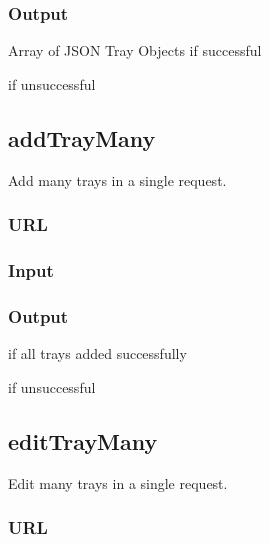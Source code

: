 \documentclass[letterpaper,10pt,english]{sphinxmanual}
\let\oldsubsection\subsection
\renewcommand{\subsection}{\needspace{6\baselineskip}\oldsubsection}
\begin{document}
\subsubsection{Output}
\label{\detokenize{docs/Developer/getAllCategory:output}}
Array of JSON Tray Objects if successful

 if unsuccessful


\subsection{addTrayMany}
\label{\detokenize{docs/Developer/addTrayMany:addtraymany}}\label{\detokenize{docs/Developer/addTrayMany::doc}}
Add many trays in a single request.


\subsubsection{URL}
\label{\detokenize{docs/Developer/addTrayMany:url}}


\subsubsection{Input}
\label{\detokenize{docs/Developer/addTrayMany:input}}
\begin{sphinxVerbatim}[commandchars=\\\{\}]
       
\end{sphinxVerbatim}


\subsubsection{Output}
\label{\detokenize{docs/Developer/addTrayMany:output}}
 if all trays added successfully

 if unsuccessful


\subsection{editTrayMany}
\label{\detokenize{docs/Developer/editTrayMany:edittraymany}}\label{\detokenize{docs/Developer/editTrayMany::doc}}
Edit many trays in a single request.


\subsubsection{URL}
\label{\detokenize{docs/Developer/editTrayMany:url}}
\end{document}

